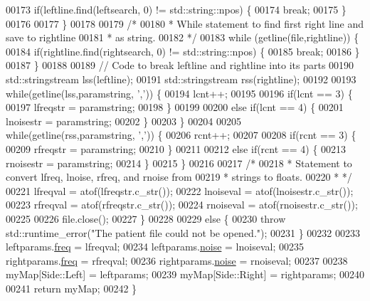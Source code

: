 \begin{DoxyCode}
00173                 \textcolor{keywordflow}{if}(leftline.find(leftsearch, 0) != std::string::npos) \{
00174                     \textcolor{keywordflow}{break};
00175                 \}
00176 
00177             \}
00178 
00179             \textcolor{comment}{/*}
00180 \textcolor{comment}{             * While statement to find first right line and save to rightline}
00181 \textcolor{comment}{             * as string.}
00182 \textcolor{comment}{             */}
00183             \textcolor{keywordflow}{while} (getline(file,rightline)) \{
00184                 \textcolor{keywordflow}{if}(rightline.find(rightsearch, 0) != std::string::npos) \{
00185                     \textcolor{keywordflow}{break};
00186                 \}
00187             \}
00188 
00189             \textcolor{comment}{// Code to break leftline and rightline into its parts}
00190             std::stringstream lss(leftline);
00191             std::stringstream rss(rightline);
00192 
00193             \textcolor{keywordflow}{while}(getline(lss,paramstring, \textcolor{charliteral}{','})) \{
00194                 lcnt++;
00195 
00196                 \textcolor{keywordflow}{if}(lcnt == 3) \{
00197                     lfreqstr = paramstring;
00198                 \}
00199 
00200                 \textcolor{keywordflow}{else} \textcolor{keywordflow}{if}(lcnt == 4) \{
00201                     lnoisestr = paramstring;
00202                 \}
00203             \}
00204 
00205             \textcolor{keywordflow}{while}(getline(rss,paramstring, \textcolor{charliteral}{','})) \{
00206                 rcnt++;
00207 
00208                 \textcolor{keywordflow}{if}(rcnt == 3) \{
00209                     rfreqstr = paramstring;
00210                 \}
00211 
00212                 \textcolor{keywordflow}{else} \textcolor{keywordflow}{if}(rcnt == 4) \{
00213                     rnoisestr = paramstring;
00214                 \}
00215             \}
00216 
00217             \textcolor{comment}{/*}
00218 \textcolor{comment}{             * Statement to convert lfreq, lnoise, rfreq, and rnoise from}
00219 \textcolor{comment}{             * strings to floats.}
00220 \textcolor{comment}{             * */}
00221             lfreqval = atof(lfreqstr.c\_str());
00222             lnoiseval = atof(lnoisestr.c\_str());
00223             rfreqval = atof(rfreqstr.c\_str());
00224             rnoiseval = atof(rnoisestr.c\_str());
00225 
00226             file.close();
00227         \}
00228 
00229         \textcolor{keywordflow}{else} \{
00230             \textcolor{keywordflow}{throw} std::runtime\_error(\textcolor{stringliteral}{"The patient file could not be opened."});
00231         \}
00232 
00233         leftparams.\hyperlink{structDataParams_a12566e017407647bc8287d62554ad3fb}{freq} = lfreqval;
00234         leftparams.\hyperlink{structDataParams_a4efd1d2231c6fa7c878c9d5e1650738f}{noise} = lnoiseval;
00235         rightparams.\hyperlink{structDataParams_a12566e017407647bc8287d62554ad3fb}{freq} = rfreqval;
00236         rightparams.\hyperlink{structDataParams_a4efd1d2231c6fa7c878c9d5e1650738f}{noise} = rnoiseval;
00237 
00238         myMap[Side::Left] = leftparams;
00239         myMap[Side::Right] = rightparams;
00240 
00241         \textcolor{keywordflow}{return} myMap;
00242     \}
\end{DoxyCode}
